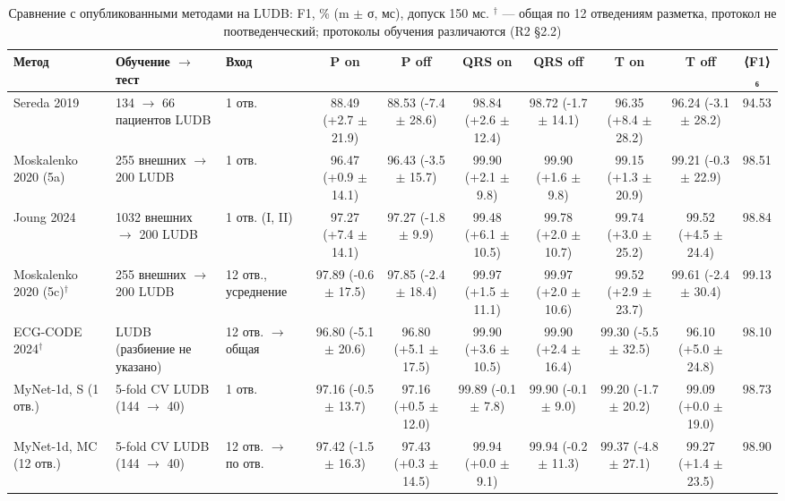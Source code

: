 \begin{table}[t]
\centering
\small
\caption{Сравнение с опубликованными методами на LUDB: F1, \% (m $\pm$ σ, мс), допуск 150 мс. $^\dagger$ — общая по 12 отведениям разметка, протокол не поотведенческий; протоколы обучения различаются (R2 §2.2)}
\label{tab:benchmarks}
\begin{tabular}{lllccccccc}
\toprule
Метод & Обучение $\to$ тест & Вход & P on & P off & QRS on & QRS off & T on & T off & ⟨F1⟩₆ \\
\midrule
Sereda 2019 & 134 $\to$ 66 пациентов LUDB & 1 отв. & 88.49 (+2.7 $\pm$ 21.9) & 88.53 (-7.4 $\pm$ 28.6) & 98.84 (+2.6 $\pm$ 12.4) & 98.72 (-1.7 $\pm$ 14.1) & 96.35 (+8.4 $\pm$ 28.2) & 96.24 (-3.1 $\pm$ 28.2) & 94.53 \\
Moskalenko 2020 (5a) & 255 внешних $\to$ 200 LUDB & 1 отв. & 96.47 (+0.9 $\pm$ 14.1) & 96.43 (-3.5 $\pm$ 15.7) & 99.90 (+2.1 $\pm$ 9.8) & 99.90 (+1.6 $\pm$ 9.8) & 99.15 (+1.3 $\pm$ 20.9) & 99.21 (-0.3 $\pm$ 22.9) & 98.51 \\
Joung 2024 & 1032 внешних $\to$ 200 LUDB & 1 отв. (I, II) & 97.27 (+7.4 $\pm$ 14.1) & 97.27 (-1.8 $\pm$ 9.9) & 99.48 (+6.1 $\pm$ 10.5) & 99.78 (+2.0 $\pm$ 10.7) & 99.74 (+3.0 $\pm$ 25.2) & 99.52 (+4.5 $\pm$ 24.4) & 98.84 \\
Moskalenko 2020 (5c)$^\dagger$ & 255 внешних $\to$ 200 LUDB & 12 отв., усреднение & 97.89 (-0.6 $\pm$ 17.5) & 97.85 (-2.4 $\pm$ 18.4) & 99.97 (+1.5 $\pm$ 11.1) & 99.97 (+2.0 $\pm$ 10.6) & 99.52 (+2.9 $\pm$ 23.7) & 99.61 (-2.4 $\pm$ 30.4) & 99.13 \\
ECG-CODE 2024$^\dagger$ & LUDB (разбиение не указано) & 12 отв. $\to$ общая & 96.80 (-5.1 $\pm$ 20.6) & 96.80 (+5.1 $\pm$ 17.5) & 99.90 (+3.6 $\pm$ 10.5) & 99.90 (+2.4 $\pm$ 16.4) & 99.30 (-5.5 $\pm$ 32.5) & 96.10 (+5.0 $\pm$ 24.8) & 98.10 \\
MyNet-1d, S (1 отв.) & 5-fold CV LUDB (144 $\to$ 40) & 1 отв. & 97.16 (-0.5 $\pm$ 13.7) & 97.16 (+0.5 $\pm$ 12.0) & 99.89 (-0.1 $\pm$ 7.8) & 99.90 (-0.1 $\pm$ 9.0) & 99.20 (-1.7 $\pm$ 20.2) & 99.09 (+0.0 $\pm$ 19.0) & 98.73 \\
MyNet-1d, MC (12 отв.) & 5-fold CV LUDB (144 $\to$ 40) & 12 отв. $\to$ по отв. & 97.42 (-1.5 $\pm$ 16.3) & 97.43 (+0.3 $\pm$ 14.5) & 99.94 (+0.0 $\pm$ 9.1) & 99.94 (-0.2 $\pm$ 11.3) & 99.37 (-4.8 $\pm$ 27.1) & 99.27 (+1.4 $\pm$ 23.5) & 98.90 \\
\bottomrule
\end{tabular}
\end{table}
